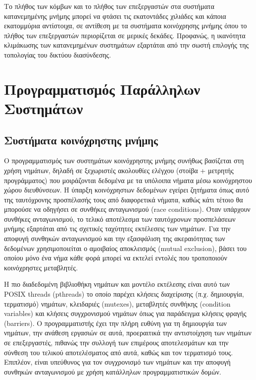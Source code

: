 Το πλήθος των κόμβων και το πλήθος των επεξεργαστών στα συστήματα κατανεμημένης μνήμης μπορεί να φτάσει τις εκατοντάδες χιλιάδες και κάποια εκατομμύρια αντίστοιχα, σε αντίθεση με τα συστήματα κοινόχρησης μνήμης όπου το πλήθος των επεξεργαστών περιορίζεται σε μερικές δεκάδες. Προφανώς, η ικανότητα κλιμάκωσης των κατανεμημένων συστημάτων εξαρτάται από την σωστή επιλογής της τοπολογίας του δικτύου διασύνδεσης.




\section{Προγραμματισμός Παράλληλων Συστημάτων}

\subsection{Συστήματα κοινόχρηστης μνήμης}
\label{ssec:Shared Memory Programming}
Ο προγραμματισμός των συστημάτων κοινόχρηστης μνήμης συνήθως βασίζεται στη χρήση νημάτων, δηλαδή σε ξεχωριστές ακολουθίες ελέγχου (στοίβα + μετρητής προγράμματος) που μοιράζονται δεδομένα με τα υπόλοιπα  νήματα μέσω κοινόχρηστου χώρου διευθύνσεων. Η ύπαρξη κοινόχρηστων δεδομένων εγείρει ζητήματα όπως αυτό της ταυτόχρονης προσπέλασής τους από διαφορετικά νήματα, καθώς κάτι τέτοιο θα μπορούσε να οδηγήσει σε συνθήκες ανταγωνισμού (race conditions). Όταν υπάρχουν συνθήκες ανταγωνισμού, το τελικό αποτέλεσμα των ταυτόχρονων προσπελάσεων μνήμης εξαρτάται από τις σχετικές ταχύτητες εκτέλεσεις των νημάτων. Για την αποφυγή συνθηκών ανταγωνισμού και την εξασφάλιση της ακεραιότητας των δεδομένων χρησιμοποιείται ο αμοιβαίος αποκλεισμός (mutual exclusion), βάσει του οποίου μόνο ένα νήμα κάθε φορά μπορεί να εκτελεί εντολές που τροποποιούν κοινόχρηστες μεταβλητές.

Η πιο διαδεδομένη βιβλιοθήκη νημάτων και μοντέλο εκτέλεσης είναι αυτό των POSIX threads (pthreads) το οποίο παρέχει κλήσεις διαχείρισης (π.χ. δημιουργία, τερματισμό) νημάτων, κλειδαριές (mutexes), μεταβλητές συνθήκης (condition variables) και κλήσεις συγχρονισμού νημάτων όπως για παράδειγμα κλήσεις φραγής (barriers). Ο προγραμματιστής έχει την πλήρη ευθύνη για τη δημιουργία των νημάτων, την ανάθεση εργασιών σε αυτά, προεραιτικά την αντιστοίχηση των νημάτων σε επεξεργαστές, πιθανώς την συλλογή των επιμέρους αποτελεσμάτων και την σύνθεση του τελικού αποτελέσματος από αυτά, καθώς και τον τερματισμό τους. Επιπλέον, είναι υπεύθυνος για τον συγχρονισμό των νημάτων και την αποφυγή συνθηκών ανταγωνισμού με χρήση κατάλληλων προγραμματιστικών δομών.

